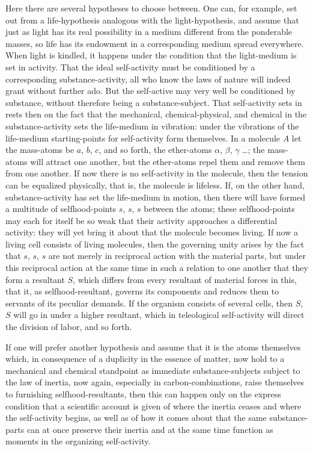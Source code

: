 \documentclass[12pt]{book}
\begin{document}
Here there are several hypotheses to choose between. One can, for example, set out from a
life-hypothesis analogous with the light-hypothesis, and assume that just as light has its
real possibility in a medium different from the ponderable masses, so life has its
endowment in a corresponding medium spread everywhere. When light is kindled, it happens
under the condition that the light-medium is set in activity. That the ideal self-activity
must be conditioned by a corresponding substance-activity, all who know the laws of nature
will indeed grant without further ado. But the self-active may very well be conditioned by
substance, without therefore being a substance-subject. That self-activity sets in rests
then on the fact that the mechanical, chemical-physical, and chemical in the
substance-activity sets the life-medium in vibration: under the vibrations of the
life-medium starting-points for self-activity form themselves. In a molecule $A$ let the
mass-atoms be $a$, $b$, $c$, and so forth, the ether-atoms $\alpha$, $\beta$, $\gamma$
\ldots; the mass-atoms will attract one another, but the ether-atoms repel them and remove
them from one another. If now there is no self-activity in the molecule, then the tension
can be equalized physically, that is, the molecule is lifeless. If, on the other hand,
substance-activity has set the life-medium in motion, then there will have formed a
multitude of selfhood-points $s$, $s$, $s$ between the atoms; these selfhood-points may
each for itself be so weak that their activity approaches a differential activity: they
will yet bring it about that the molecule becomes living. If now a living cell consists of
living molecules, then the governing unity arises by the fact that $s$, $s$, $s$ are not
merely in reciprocal action with the material parts, but under this reciprocal action at
the same time in such a relation to one another that they form a resultant $S$, which
differs from every resultant of material forces in this, that it, as selfhood-resultant,
governs its components and reduces them to servants of its peculiar demands. If the organism
consists of several cells, then $S$, $S$ will go in under a higher resultant, which in
teleological self-activity will direct the division of labor, and so forth.

If one will prefer another hypothesis and assume that it is the atoms themselves which, in
consequence of a duplicity in the essence of matter, now hold to a mechanical and chemical
standpoint as immediate substance-subjects subject to the law of inertia, now again,
especially in carbon-combinations, raise themselves to furnishing selfhood-resultants, then
this can happen only on the express condition that a scientific account is given of where
the inertia ceases and where the self-activity begins, as well as of how it comes about that
the same substance-parts can at once preserve their inertia and at the same time function as
moments in the organizing self-activity.
\end{document}
